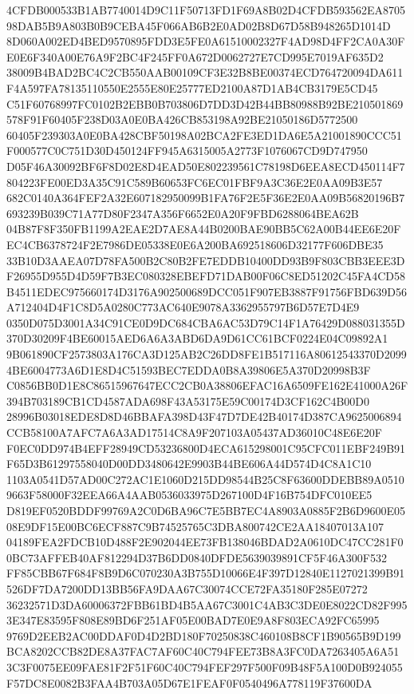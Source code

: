 \documentclass[UTF8,fontset=fandol,zihao=-4,a4paper]{ctexart}
\begin{document}
{{4CFDB000533B1AB7740014D9C11F50713FD1F69A8B02D4CFDB593562EA870598DAB5B9A803B0B9CEBA45F066AB6B2E0AD02B8D67D58B948265D1014D
8D060A002ED4BED9570895FDD3E5FE0A61510002327F4AD98D4FF2CA0A30FE0E6F340A00E76A9F2BC4F245FF0A672D0062727E7CD995E7019AF635D2
38009B4BAD2BC4C2CB550AAB00109CF3E32B8BE00374ECD764720094DA611F4A597FA78135110550E2555E80E25777ED2100A87D1AB4CB3179E5CD45
C51F60768997FC0102B2EBB0B703806D7DD3D42B44BB80988B92BE210501869578F91F60405F238D03A0E0BA426CB853198A92BE21050186D5772500
60405F239303A0E0BA428CBF50198A02BCA2FE3ED1DA6E5A21001890CCC51F000577C0C751D30D450124FF945A6315005A2773F1076067CD9D747950
D05F46A30092BF6F8D02E8D4EAD50E802239561C78198D6EEA8ECD450114F7804223FE00ED3A35C91C589B60653FC6EC01FBF9A3C36E2E0AA09B3E57
682C0140A364FEF2A32E607182950099B1FA76F2E5F36E2E0AA09B56820196B7693239B039C71A77D80F2347A356F6652E0A20F9FBD6288064BEA62B
04B87F8F350FB1199A2EAE2D7AE8A44B0200BAE90BB5C62A00B44EE6E20FEC4CB6378724F2E7986DE05338E0E6A200BA692518606D32177F606DBE35
33B10D3AAEA07D78FA500B2C80B2FE7EDDB10400DD93B9F803CBB3EEE3DF26955D955D4D59F7B3EC080328EBEFD71DAB00F06C8ED51202C45FA4CD58
B4511EDEC975660174D3176A902500689DCC051F907EB3887F91756FBD639D56A712404D4F1C8D5A0280C773AC640E9078A3362955797B6D57E7D4E9
0350D075D3001A34C91CE0D9DC684CBA6AC53D79C14F1A76429D088031355D370D30209F4BE60015AED6A6A3ABD6DA9D61CC61BCF0224E04C09892A1
9B061890CF2573803A176CA3D125AB2C26DD8FE1B517116A80612543370D20994BE6004773A6D1E8D4C51593BEC7EDDA0B8A39806E5A370D20998B3F
C0856BB0D1E8C86515967647ECC2CB0A38806EFAC16A6509FE162E41000A26F394B703189CB1CD4587ADA698F43A53175E59C00174D3CF162C4B00D0
28996B03018EDE8D8D46BBAFA398D43F47D7DE42B40174D387CA9625006894CCB58100A7AFC7A6A3AD17514C8A9F207103A05437AD36010C48E6E20F
F0EC0DD974B4EFF28949CD53236800D4ECA615298001C95CFC011EBF249B91F65D3B61297558040D00DD3480642E9903B44BE606A44D574D4C8A1C10
1103A0541D57AD00C272AC1E1060D215DD98544B25C8F63600DDEBB89A05109663F58000F32EEA66A4AAB0536033975D267100D4F16B754DFC010EE5
D819EF0520BDDF99769A2C0D6BA96C7E5BB7EC4A8903A0885F2B6D9600E0508E9DF15E00BC6ECF887C9B74525765C3DBA800742CE2AA18407013A107
04189FEA2FDCB10D488F2E902044EE73FB138046BDAD2A0610DC47CC281F00BC73AFFEB40AF812294D37B6DD0840DFDE5639039891CF5F46A300F532
FF85CBB67F684F8B9D6C070230A3B755D10066E4F397D12840E1127021399B91526DF7DA7200DD13BB56FA9DAA67C30074CCE72FA35180F285E07272
36232571D3DA60006372FBB61BD4B5AA67C3001C4AB3C3DE0E8022CD82F9953E347E83595F808E89BD6F251AF05E00BAD7E0E9A8F803ECA92FC65995
9769D2EEB2AC00DDAF0D4D2BD180F70250838C460108B8CF1B90565B9D199BCA8202CCB82DE8A37FAC7AF60C40C794FEE73B8A3FC0DA7263405A6A51
3C3F0075EE09FAE81F2F51F60C40C794FEF297F500F09B48F5A100D0B924055F57DC8E0082B3FAA4B703A05D67E1FEAF0F0540496A778119F37600DA
}}
\end{document}
